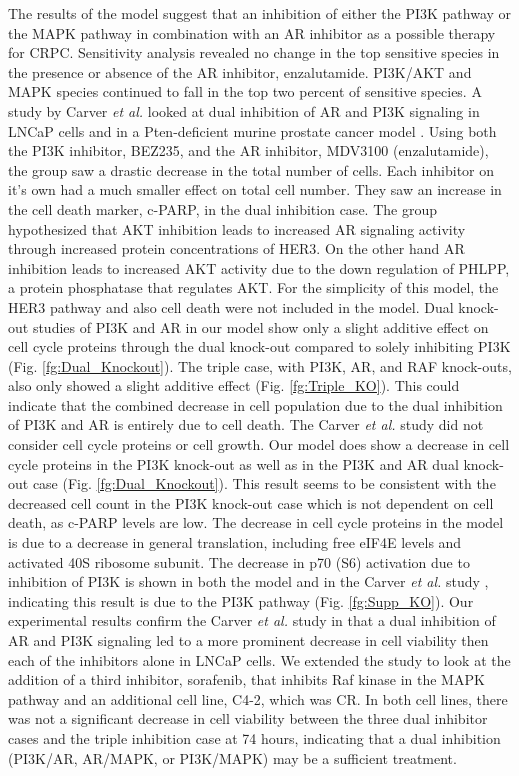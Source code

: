 \documentclass[12pt]{article}
\begin{document}
The results of the model suggest that an inhibition of either the PI3K pathway or the MAPK pathway in combination with an AR inhibitor as a possible therapy for CRPC. 
Sensitivity analysis revealed no change in the top sensitive species in the presence or absence of the AR inhibitor, enzalutamide. 
PI3K/AKT and MAPK species continued to fall in the top two percent of sensitive species. 
A study by Carver \textit{et al.} looked at dual inhibition of AR and PI3K signaling in LNCaP cells and in a Pten-deficient murine prostate cancer model \cite{Parker2013}. 
Using both the PI3K inhibitor, BEZ235, and the AR inhibitor, MDV3100 (enzalutamide), the group saw a drastic decrease in the total number of cells. 
Each inhibitor on it’s own had a much smaller effect on total cell number. They saw an increase in the cell death marker, c-PARP, in the dual inhibition case. 
The group hypothesized that AKT inhibition leads to increased AR signaling activity through increased protein concentrations of HER3. 
On the other hand AR inhibition leads to increased AKT activity due to the down regulation of PHLPP, a protein phosphatase that regulates AKT. 
For the simplicity of this model, the HER3 pathway and also cell death were not included in the model. 
Dual knock-out studies of PI3K and AR in our model show only a slight additive effect on cell cycle proteins through the dual knock-out compared to solely inhibiting PI3K (Fig. \ref{fg:Dual_Knockout}).
The triple case, with PI3K, AR, and RAF knock-outs, also only showed a slight additive effect (Fig. \ref{fg:Triple_KO}).
This could indicate that the combined decrease in cell population due to the dual inhibition of PI3K and AR is entirely due to cell death. 
The Carver \textit{et al.} study did not consider cell cycle proteins or cell growth. 
Our model does show a decrease in cell cycle proteins in the PI3K knock-out as well as in the PI3K and AR dual knock-out case (Fig. \ref{fg:Dual_Knockout}). 
This result seems to be consistent with the decreased cell count in the PI3K knock-out case which is not dependent on cell death, as c-PARP levels are low. 
The decrease in cell cycle proteins in the model is due to a decrease in general translation, including free eIF4E levels and activated 40S ribosome subunit. 
The decrease in p70 (S6) activation due to inhibition of PI3K is shown in both the model and in the Carver \textit{et al.} study , indicating this result is due to the PI3K pathway (Fig. \ref{fg:Supp_KO}). 
Our experimental results confirm the Carver \textit{et al.} study in that a dual inhibition of AR and PI3K signaling led to a more prominent decrease in cell viability then each of the inhibitors alone in LNCaP cells. 
We extended the study to look at the addition of a third inhibitor, sorafenib, that inhibits Raf kinase in the MAPK pathway and an additional cell line, C4-2, which was CR.  In both cell lines, there was not a significant decrease in cell viability between the three dual inhibitor cases and the triple inhibition case at 74 hours, indicating that a dual inhibition (PI3K/AR, AR/MAPK, or PI3K/MAPK) may be a sufficient treatment. 
\end{document}
